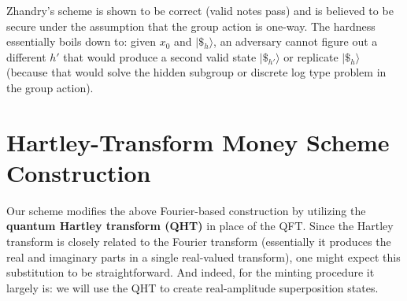 \documentclass[12pt]{report}
\begin{document}
Zhandry’s scheme is shown to be correct (valid notes pass) and is believed to be secure under the assumption that the group action is one-way. The hardness essentially boils down to: given $x_0$ and $|\$_h\rangle$, an adversary cannot figure out a different $h'$ that would produce a second valid state $|\$_{h'}\rangle$ or replicate $|\$_h\rangle$ (because that would solve the hidden subgroup or discrete log type problem in the group action).

\section{Hartley-Transform Money Scheme Construction}
Our scheme modifies the above Fourier-based construction by utilizing the \textbf{quantum Hartley transform (QHT)} in place of the QFT. Since the Hartley transform is closely related to the Fourier transform (essentially it produces the real and imaginary parts in a single real-valued transform), one might expect this substitution to be straightforward. And indeed, for the minting procedure it largely is: we will use the QHT to create real-amplitude superposition states.
\end{document}
